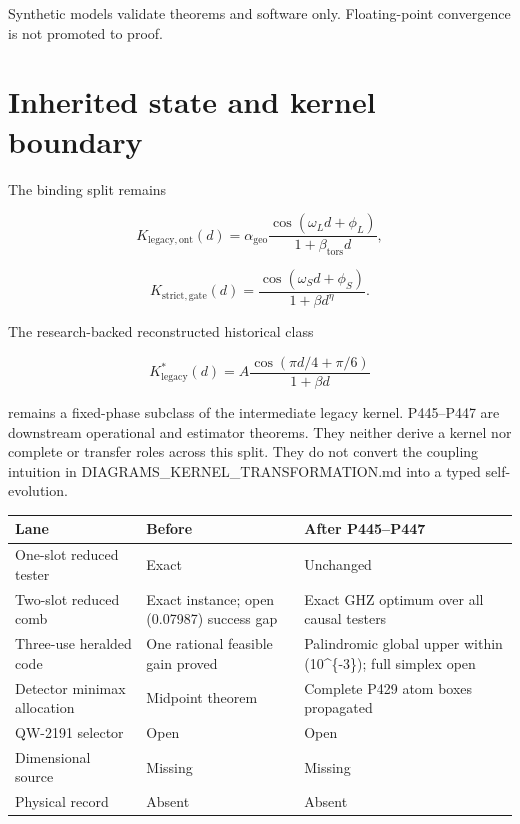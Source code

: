 \documentclass[11pt,a4paper,openany]{report}
\begin{document}
Synthetic models validate theorems and software only. Floating-point convergence is not promoted to proof.

\chapter{Inherited state and kernel boundary}

The binding split remains

\[
K_{\mathrm{legacy,ont}}(d)
=\alpha_{\mathrm{geo}}
\frac{\cos(\omega_Ld+\phi_L)}{1+\beta_{\mathrm{tors}}d},
\]

\[
K_{\mathrm{strict,gate}}(d)
=\frac{\cos(\omega_Sd+\phi_S)}{1+\beta d^\eta}.
\]

The research-backed reconstructed historical class

\[
K^*_{\mathrm{legacy}}(d)
=A\frac{\cos(\pi d/4+\pi/6)}{1+\beta d}
\]

remains a fixed-phase subclass of the intermediate legacy kernel. P445--P447 are downstream operational and estimator theorems. They neither derive a kernel nor complete or transfer roles across this split. They do not convert the coupling intuition in DIAGRAMS\_KERNEL\_TRANSFORMATION.md into a typed self-evolution.

\begin{center}
\begingroup\small
\setlength{\tabcolsep}{2.5pt}
\renewcommand{\arraystretch}{1.16}
\begin{longtable}{@{}p{}p{}p{}@{}}
\toprule
\textbf{Lane} & \textbf{Before} & \textbf{After P445--P447} \\
\midrule
\endhead
One-slot reduced tester & Exact & Unchanged \\
Two-slot reduced comb & Exact instance; open (0.07987) success gap & Exact GHZ optimum over all causal testers \\
Three-use heralded code & One rational feasible gain proved & Palindromic global upper within (10\textasciicircum{}\{-3\}); full simplex open \\
Detector minimax allocation & Midpoint theorem & Complete P429 atom boxes propagated \\
QW-2191 selector & Open & Open \\
Dimensional source & Missing & Missing \\
Physical record & Absent & Absent \\
\bottomrule
\end{longtable}
\endgroup
\end{center}
\end{document}
